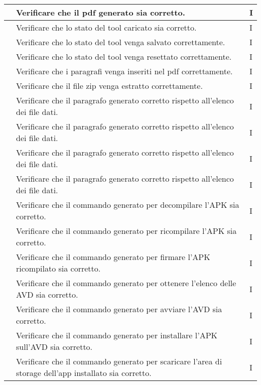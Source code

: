 \begin{center}
\begin{longtable}{ |C{3cm} | C{8.5cm}| C{1.5cm} |}
         & Verificare che il pdf generato sia corretto.
        & I \\\hline
         & Verificare che lo stato del tool caricato sia corretto.
        & I \\\hline
         & Verificare che lo stato del tool venga salvato correttamente.
        & I \\\hline
         & Verificare che lo stato del tool venga resettato correttamente.
        & I \\\hline
         & Verificare che i paragrafi venga inseriti nel pdf correttamente.
        & I \\\hline
         & Verificare che il file zip venga estratto correttamente.
        & I \\\hline
         & Verificare che il paragrafo generato corretto rispetto all'elenco dei file dati.
        & I \\\hline
         & Verificare che il paragrafo generato corretto rispetto all'elenco dei file dati.
        & I \\\hline
         & Verificare che il paragrafo generato corretto rispetto all'elenco dei file dati.
        & I \\\hline
         & Verificare che il paragrafo generato corretto rispetto all'elenco dei file dati.
        & I \\\hline
         & Verificare che il commando generato per decompilare l'APK sia corretto.
        & I \\\hline
         & Verificare che il commando generato per ricompilare l'APK sia corretto.
        & I \\\hline
         & Verificare che il commando generato per firmare l'APK ricompilato sia corretto.
        & I \\\hline
         & Verificare che il commando generato per ottenere l'elenco delle AVD sia corretto.
        & I \\\hline
         & Verificare che il commando generato per avviare l'AVD sia corretto.
        & I \\\hline
         & Verificare che il commando generato per installare l'APK sull'AVD sia corretto.
        & I \\\hline
         & Verificare che il commando generato per scaricare l'area di storage dell'app installato sia corretto.
        & I \\\hline

\end{longtable}
\end{center}
